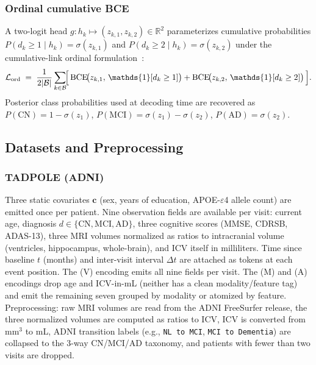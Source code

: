 \documentclass{article}
\begin{document}
\subsubsection{Ordinal cumulative BCE}
A two-logit head $g: h_k \mapsto (z_{k,1}, z_{k,2}) \in \mathbb{R}^2$ parameterizes cumulative probabilities
$P(d_k \geq 1 \mid h_k) = \sigma(z_{k,1})$ and $P(d_k \geq 2 \mid h_k) = \sigma(z_{k,2})$
under the cumulative-link ordinal formulation~\citep{frank2001simple,niu2016ordinal}:
\begin{equation}
    \mathcal{L}_{\text{ord}}
    \;=\; \frac{1}{2|\mathcal{B}|} \sum_{k \in \mathcal{B}}\!
    \Bigl[\,
      \mathrm{BCE}\!\bigl(z_{k,1},\, \mathds{1}[d_k \geq 1]\bigr)
    + \mathrm{BCE}\!\bigl(z_{k,2},\, \mathds{1}[d_k \geq 2]\bigr)
    \,\Bigr].
    \label{eq:ord}
\end{equation}
Posterior class probabilities used at decoding time are recovered as $P(\text{CN}) = 1 - \sigma(z_1)$, $P(\text{MCI}) = \sigma(z_1) - \sigma(z_2)$, $P(\text{AD}) = \sigma(z_2)$.

\subsection{Datasets and Preprocessing}
\label{app:datasets}

\subsubsection{TADPOLE (ADNI)}
Three static covariates $\mathbf{c}$ (sex, years of education, APOE-$\varepsilon$4 allele count) are emitted once per patient. Nine observation fields are available per visit: current age, diagnosis $d \in \{\text{CN}, \text{MCI}, \text{AD}\}$, three cognitive scores (MMSE, CDRSB, ADAS-13), three MRI volumes normalized as ratios to intracranial volume (ventricles, hippocampus, whole-brain), and ICV itself in milliliters. Time since baseline $t$ (months) and inter-visit interval $\Delta t$ are attached as tokens at each event position.
The (V) encoding emits all nine fields per visit. The (M) and (A) encodings drop age and ICV-in-mL (neither has a clean modality/feature tag) and emit the remaining seven grouped by modality or atomized by feature.
Preprocessing: raw MRI volumes are read from the ADNI FreeSurfer release, the three normalized volumes are computed as ratios to ICV, ICV is converted from mm$^3$ to mL, ADNI transition labels (e.g., \texttt{NL to MCI}, \texttt{MCI to Dementia}) are collapsed to the 3-way CN/MCI/AD taxonomy, and patients with fewer than two visits are dropped.
\end{document}
